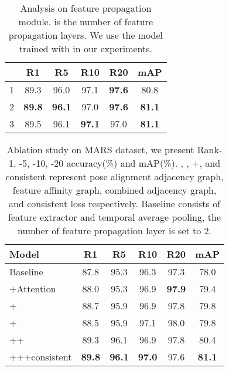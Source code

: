 \documentclass[journal]{IEEEtran}
\let\MYoriglatexcaption\caption
\renewcommand{\caption}[2][\relax]{\MYoriglatexcaption[#2]{#2}}
\begin{document}
\begin{table}[ht]
    \centering
        \begin{tabular}{ l | c | c | c | c | c }
            \hline
             & R1 & R5 & R10 & R20 & mAP \\ \hline
            1  & 89.3 & 96.0 &97.1  &\textbf{97.6} &80.8  \\
            2  & \textbf{89.8} & \textbf{96.1} &97.0 &\textbf{97.6} & \textbf{81.1}  \\
            3  & 89.5 & 96.1 &\textbf{97.1} &97.0 & \textbf{81.1} \\ \hline
        \end{tabular}
        \vspace{0.5em}
        \caption{Analysis on feature propagation module.  is the number of feature propagation layers. We use the model trained with  in our experiments.}
\label{tab:k}
\end{table}

\begin{table}[ht]
    \centering
        \begin{tabular}{ l | c | c | c | c | c}
            \hline
                Model   & R1 & R5 & R10 &R20 & mAP \\ \hline
                Baseline  & 87.8  &95.3   & 96.3   &97.3 & 78.0 \\
                \hspace{1em}+Attention & 88.0  &95.3  &96.9  &\textbf{97.9} & 79.4 \\
                \hspace{1em}+ & 88.7  & 95.9 & 96.9 &97.8 & 79.8 \\
                \hspace{1em}+ & 88.5  & 95.9 & 97.1 &98.0 & 79.8 \\
                \hspace{1em}++  & 89.3 &96.1 & 96.9 &97.8 &80.4\\
                \hspace{1em}+++consistent  & \textbf{89.8}  & \textbf{96.1}  &\textbf{97.0} &97.6 & \textbf{81.1} \\ \hline
        \end{tabular}
        \vspace{0.5em}
        \caption{Ablation study on MARS dataset, we present Rank-1, -5, -10, -20 accuracy(\%) and mAP(\%). , , +, and consistent represent pose alignment adjacency graph, feature affinity graph, combined adjacency graph, and consistent loss respectively. Baseline consists of feature extractor and temporal average pooling, the number of feature propagation layer is set to 2.}
\label{tab:ablation}
\end{table}
\end{document}
